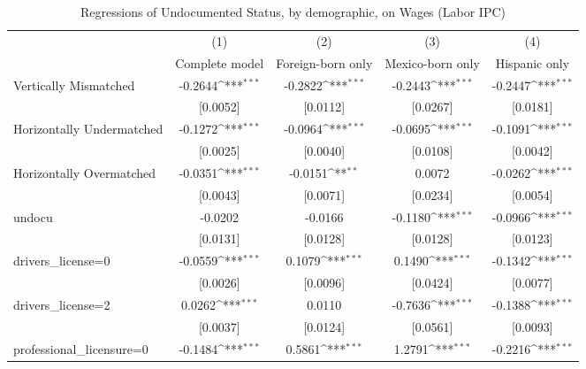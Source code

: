 \begin{table}[htbp]\centering
\def\sym#1{\ifmmode^{#1}\else\(^{#1}\)\fi}
\caption{Regressions of Undocumented Status, by demographic, on Wages (Labor IPC)}
\begin{tabular}{l*{4}{c}}
\toprule
                    &\multicolumn{1}{c}{(1)}         &\multicolumn{1}{c}{(2)}         &\multicolumn{1}{c}{(3)}         &\multicolumn{1}{c}{(4)}         \\
                    &Complete model         &Foreign-born only         &Mexico-born only         &Hispanic only         \\
\midrule
Vertically Mismatched&     -0.2644\sym{***}&     -0.2822\sym{***}&     -0.2443\sym{***}&     -0.2447\sym{***}\\
                    &    [0.0052]         &    [0.0112]         &    [0.0267]         &    [0.0181]         \\
\addlinespace
Horizontally Undermatched&     -0.1272\sym{***}&     -0.0964\sym{***}&     -0.0695\sym{***}&     -0.1091\sym{***}\\
                    &    [0.0025]         &    [0.0040]         &    [0.0108]         &    [0.0042]         \\
\addlinespace
Horizontally Overmatched&     -0.0351\sym{***}&     -0.0151\sym{**} &      0.0072         &     -0.0262\sym{***}\\
                    &    [0.0043]         &    [0.0071]         &    [0.0234]         &    [0.0054]         \\
\addlinespace
undocu              &     -0.0202         &     -0.0166         &     -0.1180\sym{***}&     -0.0966\sym{***}\\
                    &    [0.0131]         &    [0.0128]         &    [0.0128]         &    [0.0123]         \\
\addlinespace
drivers\_license=0   &     -0.0559\sym{***}&      0.1079\sym{***}&      0.1490\sym{***}&     -0.1342\sym{***}\\
                    &    [0.0026]         &    [0.0096]         &    [0.0424]         &    [0.0077]         \\
\addlinespace
drivers\_license=2   &      0.0262\sym{***}&      0.0110         &     -0.7636\sym{***}&     -0.1388\sym{***}\\
                    &    [0.0037]         &    [0.0124]         &    [0.0561]         &    [0.0093]         \\
\addlinespace
professional\_licensure=0&     -0.1484\sym{***}&      0.5861\sym{***}&      1.2791\sym{***}&     -0.2216\sym{***}\\

\end{tabular}
\end{table}
